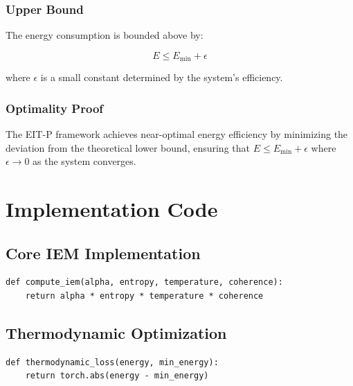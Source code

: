 \documentclass[12pt]{article}
\begin{document}
\subsubsection{Upper Bound}

The energy consumption is bounded above by:

\begin{equation}
E \leq E_{\min} + \epsilon
\end{equation}

where $\epsilon$ is a small constant determined by the system's efficiency.

\subsubsection{Optimality Proof}

The EIT-P framework achieves near-optimal energy efficiency by minimizing the deviation from the theoretical lower bound, ensuring that $E \leq E_{\min} + \epsilon$ where $\epsilon \to 0$ as the system converges.

\section{Implementation Code}

\subsection{Core IEM Implementation}

\begin{verbatim}
def compute_iem(alpha, entropy, temperature, coherence):
    return alpha * entropy * temperature * coherence
\end{verbatim}

\subsection{Thermodynamic Optimization}

\begin{verbatim}
def thermodynamic_loss(energy, min_energy):
    return torch.abs(energy - min_energy)
\end{verbatim}
\end{document}
